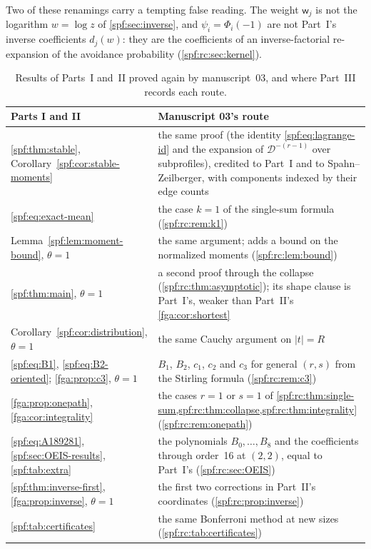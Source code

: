 \documentclass[11pt]{article}
\numberwithin{equation}{section}
\theoremstyle{definition}
\theoremstyle{remark}
\theoremstyle{definition}
\newcommand{\rcw}{\mathsf w}
\begin{document}
Two of these renamings carry a tempting false reading. The weight $\rcw_j$
is not the logarithm $w=\log z$ of \cref{spf:sec:inverse}, and
$\psi_i=\Phi_i(-1)$ are not Part~I's inverse coefficients $d_j(w)$: they are
the coefficients of an inverse-factorial re-expansion of the avoidance
probability (\cref{spf:rc:sec:kernel}).

\begin{table}[htbp]
\centering\small
\renewcommand{\arraystretch}{1.12}
\begin{tabular}{@{}>{\raggedright\arraybackslash}p{}>{\raggedright\arraybackslash}p{}@{}}
\toprule
Parts I and II & Manuscript 03's route\\
\midrule
\cref{spf:thm:stable}, Corollary~\ref{spf:cor:stable-moments} &
the same proof (the identity \eqref{spf:eq:lagrange-id} and the expansion of
$\mathcal D^{-(r-1)}$ over subprofiles), credited to Part~I and to
Spahn--Zeilberger, with components indexed by their edge counts\\
\eqref{spf:eq:exact-mean} &
the case $k=1$ of the single-sum formula (\cref{spf:rc:rem:k1})\\
Lemma~\ref{spf:lem:moment-bound}, $\theta=1$ &
the same argument; adds a bound on the normalized moments
(\cref{spf:rc:lem:bound})\\
\cref{spf:thm:main}, $\theta=1$ &
a second proof through the collapse (\cref{spf:rc:thm:asymptotic}); its
shape clause is Part~I's, weaker than Part~II's \cref{fga:cor:shortest}\\
Corollary~\ref{spf:cor:distribution}, $\theta=1$ &
the same Cauchy argument on $|t|=R$\\
\eqref{spf:eq:B1}, \eqref{spf:eq:B2-oriented}; \cref{fga:prop:c3}, $\theta=1$ &
$B_1$, $B_2$, $c_1$, $c_2$ and $c_3$ for general $(r,s)$ from the Stirling
formula (\cref{spf:rc:rem:c3})\\
\cref{fga:prop:onepath}, \cref{fga:cor:integrality} &
the cases $r=1$ or $s=1$ of \cref{spf:rc:thm:single-sum,spf:rc:thm:collapse,spf:rc:thm:integrality}
(\cref{spf:rc:rem:onepath})\\
\eqref{spf:eq:A189281}, \cref{spf:sec:OEIS-results}, \cref{spf:tab:extra} &
the polynomials $B_0,\ldots,B_8$ and the coefficients through order~16 at
$(2,2)$, equal to Part~I's (\cref{spf:rc:sec:OEIS})\\
\cref{spf:thm:inverse-first}, \cref{fga:prop:inverse}, $\theta=1$ &
the first two corrections in Part~II's coordinates
(\cref{spf:rc:prop:inverse})\\
\cref{spf:tab:certificates} &
the same Bonferroni method at new sizes (\cref{spf:rc:tab:certificates})\\
\bottomrule
\end{tabular}
\caption{Results of Parts~I and~II proved again by manuscript~03, and where
Part~III records each route.}
\label{spf:rc:tab:routes}
\end{table}
\end{document}
